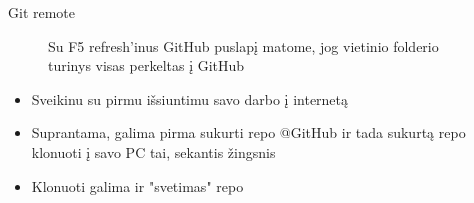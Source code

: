 \documentclass[11pt,xcolor=table]{beamer}
\begin{document}

\begin{frame}[fragile]{Git remote}
\begin{figure}
\caption{Su F5 refresh'inus GitHub puslapį matome, jog vietinio folderio turinys visas perkeltas į GitHub}
\end{figure}
\end{frame}


\begin{frame}
\begin{itemize}
\item Sveikinu su pirmu išsiuntimu savo darbo į internetą
\item Suprantama, galima pirma sukurti repo @GitHub ir tada sukurtą repo klonuoti į savo PC tai, sekantis žingsnis
\item Klonuoti galima ir "svetimas" repo
\end{itemize}
\end{frame}

\end{document}
